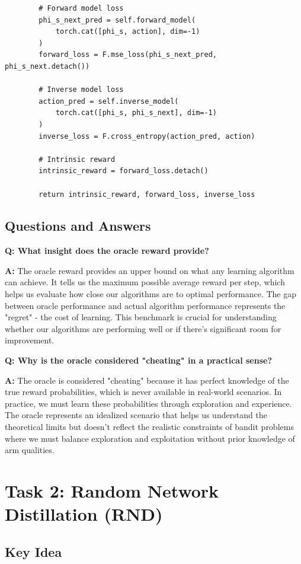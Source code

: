 \documentclass[12pt]{article}
\begin{document}
{{{\begin{verbatim}
        # Forward model loss
        phi_s_next_pred = self.forward_model(
            torch.cat([phi_s, action], dim=-1)
        )
        forward_loss = F.mse_loss(phi_s_next_pred, phi_s_next.detach())
        
        # Inverse model loss
        action_pred = self.inverse_model(
            torch.cat([phi_s, phi_s_next], dim=-1)
        )
        inverse_loss = F.cross_entropy(action_pred, action)
        
        # Intrinsic reward
        intrinsic_reward = forward_loss.detach()
        
        return intrinsic_reward, forward_loss, inverse_loss
\end{verbatim}

\subsection{Questions and Answers}

\textbf{Q: What insight does the oracle reward provide?}

\textbf{A:} The oracle reward provides an upper bound on what any learning algorithm can achieve. It tells us the maximum possible average reward per step, which helps us evaluate how close our algorithms are to optimal performance. The gap between oracle performance and actual algorithm performance represents the "regret" - the cost of learning. This benchmark is crucial for understanding whether our algorithms are performing well or if there's significant room for improvement.

\textbf{Q: Why is the oracle considered "cheating" in a practical sense?}

\textbf{A:} The oracle is considered "cheating" because it has perfect knowledge of the true reward probabilities, which is never available in real-world scenarios. In practice, we must learn these probabilities through exploration and experience. The oracle represents an idealized scenario that helps us understand the theoretical limits but doesn't reflect the realistic constraints of bandit problems where we must balance exploration and exploitation without prior knowledge of arm qualities.

\section{Task 2: Random Network Distillation (RND)}

\subsection{Key Idea}

}}}
\end{document}
